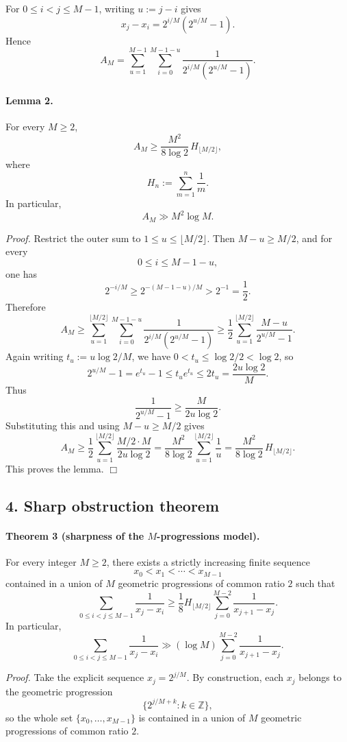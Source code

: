 For \(0\le i<j\le M-1\), writing \(u:=j-i\) gives
\[
x_j-x_i=2^{i/M}(2^{u/M}-1).
\]
Hence
\[
A_M
=\sum_{u=1}^{M-1}\sum_{i=0}^{M-1-u}\frac{1}{2^{i/M}(2^{u/M}-1)}.
\]

\paragraph{Lemma 2.}
For every \(M\ge 2\),
\[
A_M\ge \frac{M^2}{8\log 2}\,H_{\lfloor M/2\rfloor},
\]
where
\[
H_n:=\sum_{m=1}^n \frac1m.
\]
In particular,
\[
A_M\gg M^2\log M.
\]

\emph{Proof.}
Restrict the outer sum to \(1\le u\le \lfloor M/2\rfloor\). Then \(M-u\ge M/2\), and for every
\[
0\le i\le M-1-u,
\]
one has
\[
2^{-i/M}\ge 2^{-(M-1-u)/M}>2^{-1}=\frac12.
\]
Therefore
\[
A_M
\ge \sum_{u=1}^{\lfloor M/2\rfloor}\sum_{i=0}^{M-1-u}\frac{1}{2^{i/M}(2^{u/M}-1)}
\ge \frac12\sum_{u=1}^{\lfloor M/2\rfloor}\frac{M-u}{2^{u/M}-1}.
\]
Again writing \(t_u:=u\log 2/M\), we have \(0<t_u\le \log 2/2<\log 2\), so
\[
2^{u/M}-1=e^{t_u}-1\le t_u e^{t_u}\le 2t_u=\frac{2u\log 2}{M}.
\]
Thus
\[
\frac{1}{2^{u/M}-1}\ge \frac{M}{2u\log 2}.
\]
Substituting this and using \(M-u\ge M/2\) gives
\[
A_M
\ge \frac12\sum_{u=1}^{\lfloor M/2\rfloor} \frac{M/2\cdot M}{2u\log 2}
=\frac{M^2}{8\log 2}\sum_{u=1}^{\lfloor M/2\rfloor}\frac1u
=\frac{M^2}{8\log 2}\,H_{\lfloor M/2\rfloor}.
\]
This proves the lemma.
\hfill\(\Box\)

\subsection*{4. Sharp obstruction theorem}

\paragraph{Theorem 3 (sharpness of the \(M\)-progressions model).}
For every integer \(M\ge 2\), there exists a strictly increasing finite sequence
\[
x_0<x_1<\cdots <x_{M-1}
\]
contained in a union of \(M\) geometric progressions of common ratio \(2\) such that
\[
\sum_{0\le i<j\le M-1}\frac{1}{x_j-x_i}
\ge
\frac18 H_{\lfloor M/2\rfloor}
\sum_{j=0}^{M-2}\frac{1}{x_{j+1}-x_j}.
\]
In particular,
\[
\sum_{0\le i<j\le M-1}\frac{1}{x_j-x_i}
\gg (\log M)
\sum_{j=0}^{M-2}\frac{1}{x_{j+1}-x_j}.
\]

\emph{Proof.}
Take the explicit sequence \(x_j=2^{j/M}\). By construction, each \(x_j\) belongs to the geometric progression
\[
\{2^{j/M+k}:k\in \mathbb Z\},
\]
so the whole set \(\{x_0,\dots,x_{M-1}\}\) is contained in a union of \(M\) geometric progressions of common ratio \(2\).

